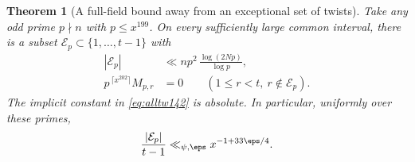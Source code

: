 \documentclass[a4paper,11pt]{article}
\newtheorem{theorem}[proposition]{Theorem}
\theoremstyle{definition}
\theoremstyle{remark}
\numberwithin{equation}{section}
\begin{document}
\begin{theorem}[A full-field bound away from an exceptional set of twists]
\label{thm:alltw142}
Take any odd prime \(p\nmid n\) with \(p\le x^{199}\). On every
sufficiently large common interval, there is a subset
\(\mathcal E_p\subset\{1,\ldots,t-1\}\) with
\begin{align}
 |\mathcal E_p|
     &\ll n p^2\,\frac{\log(2Np)}{\log p},                 \label{eq:alltw142}\\
 p^{\,\lceil x^{202}\rceil}M_{p,r}&=0
                 \qquad(1\le r<t,\ r\notin\mathcal E_p). \label{eq:exp142}
\end{align}
The implicit constant in \eqref{eq:alltw142} is absolute.
In particular, uniformly over these primes,
\[
       \frac{|\mathcal E_p|}{t-1}
              \ll_{\psi,\eps} x^{-1+33\eps/4}.
\]
\end{theorem}
\end{document}

